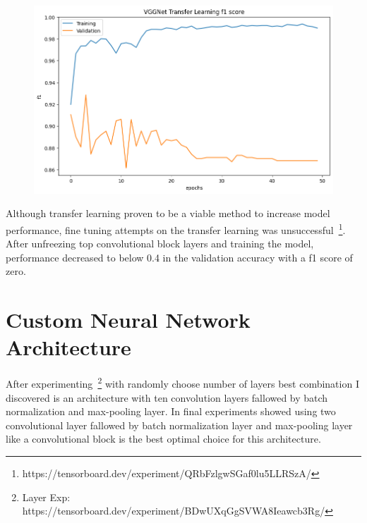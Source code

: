 \begin{figure}[H]
    \centering
    \includegraphics[width=.8\textwidth]{img/vggnettff1.png}
    \caption{}
    \label{fig:vggtff1}
\end{figure}

Although transfer learning proven to be a viable method to increase model performance, fine tuning attempts on the transfer learning was unsuccessful~\footnote{https://tensorboard.dev/experiment/QRbFzlgwSGaf0lu5LLRSzA/}.
After unfreezing top convolutional block layers and training the model, performance decreased to below 0.4 in the validation accuracy with a f1 score of zero.

\section{Custom Neural Network Architecture}
After experimenting~\footnote{Layer Exp: https://tensorboard.dev/experiment/BDwUXqGgSVWA8Ieawcb3Rg/} with randomly choose number of layers best combination I discovered is an architecture with ten convolution layers fallowed by batch normalization and max-pooling layer. 
In final experiments showed using two convolutional layer fallowed by batch normalization layer and max-pooling layer like a convolutional block is the best optimal choice for this architecture.

